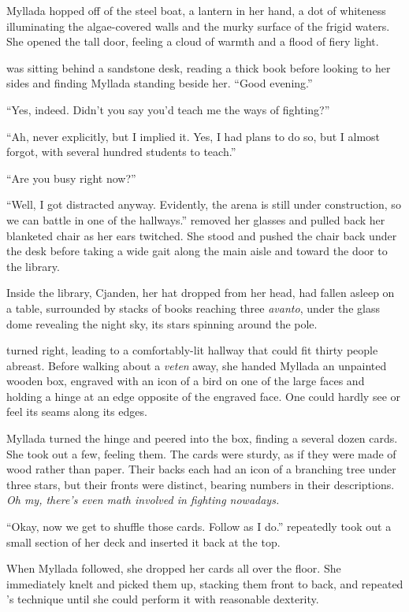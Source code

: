 \centeredstars

Myllada hopped off of the steel boat, a lantern in her hand, a dot of whiteness illuminating the algae-covered walls and the murky surface of the frigid waters. She opened the tall door, feeling a cloud of warmth and a flood of fiery light.

\yronsyncra{} was sitting behind a sandstone desk, reading a thick book before looking to her sides and finding Myllada standing beside her. ``Good evening.''

``Yes, indeed. Didn't you say you'd teach me the ways of fighting?''

``Ah, never explicitly, but I implied it. Yes, I had plans to do so, but I almost forgot, with several hundred students to teach.''

``Are you busy right now?''

``Well, I got distracted anyway. Evidently, the arena is still under construction, so we can battle in one of the hallways.'' \yronsyncra{} removed her glasses and pulled back her blanketed chair as her ears twitched. She stood and pushed the chair back under the desk before taking a wide gait along the main aisle and toward the door to the library.

Inside the library, Cjanden, her hat dropped from her head, had fallen asleep on a table, surrounded by stacks of books reaching three \emph{avanto}, under the glass dome revealing the night sky, its stars spinning around the pole.

\yronsyncra{} turned right, leading to a comfortably-lit hallway that could fit thirty people abreast. Before walking about a \emph{veten} away, she handed Myllada an unpainted wooden box, engraved with an icon of a bird on one of the large faces and holding a hinge at an edge opposite of the engraved face. One could hardly see or feel its seams along its edges.

Myllada turned the hinge and peered into the box, finding a several dozen cards. She took out a few, feeling them. The cards were sturdy, as if they were made of wood rather than paper. Their backs each had an icon of a branching tree under three stars, but their fronts were distinct, bearing numbers in their descriptions. \emph{Oh my, there's even math involved in fighting nowadays.}

``Okay, now we get to shuffle those cards. Follow as I do.'' \yronsyncra{} repeatedly took out a small section of her deck and inserted it back at the top.

When Myllada followed, she dropped her cards all over the floor. She immediately knelt and picked them up, stacking them front to back, and repeated \yronsyncra's technique until she could perform it with reasonable dexterity.

